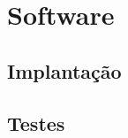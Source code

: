 \chapter{Software} \label{cha:software}

\section{Implantação} \label{sec:software:implantacao}
\section{Testes} \label{sec:software:testes}